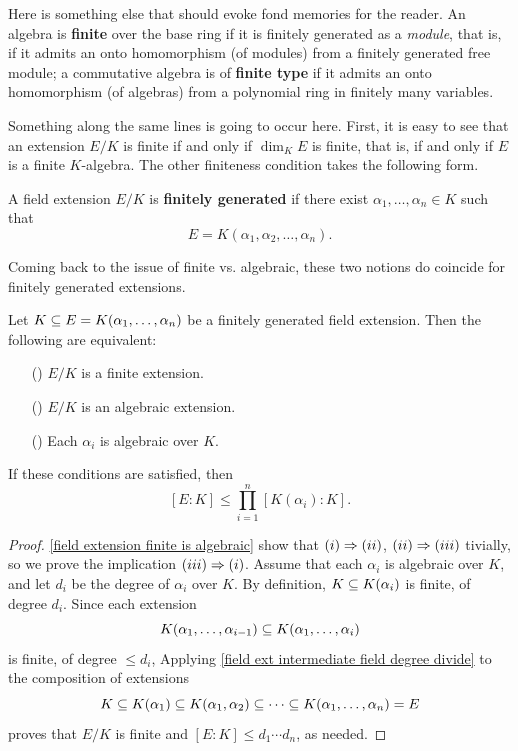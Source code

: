 Here is something else that should evoke fond memories for the reader. An algebra is \textbf{finite} over the base ring if it is finitely generated as a \textit{module}, that is, if it admits an onto homomorphism (of modules) from a finitely generated free module; a commutative algebra is of \textbf{finite type} if it admits an onto homomorphism (of algebras) from a polynomial ring in finitely many variables.\par
Something along the same lines is going to occur here. First, it is easy to see that an extension $E/K$ is finite if and only if $\dim_KE$ is finite, that is, if and only if $E$ is a finite $K$-algebra. The other finiteness condition takes the following form.
\begin{definition}
A field extension $E/K$ is \textbf{finitely generated} if there exist $\alpha_1,\dots,\alpha_n\in K$ such that
\[E=K(\alpha_1,\alpha_2,\dots,\alpha_n).\]
\end{definition}
Coming back to the issue of finite vs. algebraic, these two notions do coincide for finitely generated extensions.
\begin{proposition}\label{field ext finitely generated finite iff}
Let $K\subseteq E=K(\alpha_1,\dots,\alpha_n)$ be a finitely generated field extension. Then the following are equivalent:
\begin{itemize}
\item[(\rmnum{1})] $E/K$ is a finite extension.
\item[(\rmnum{2})] $E/K$ is an algebraic extension.
\item[(\rmnum{3})] Each $\alpha_i$ is algebraic over $K$.
\end{itemize}
If these conditions are satisfied, then 
\[[E:K]\leq\prod_{i=1}^{n}[K(\alpha_i):K].\]
\end{proposition}
\begin{proof}
\cref{field extension finite is algebraic} show that $(\rmnum{1})\Rightarrow(\rmnum{2})$, $(\rmnum{2})\Rightarrow(\rmnum{3})$ tivially, so we prove the implication $(\rmnum{3})\Rightarrow(\rmnum{1})$. Assume that each $\alpha_i$ is algebraic over $K$, and let $d_i$ be the degree of $\alpha_i$ over $K$. By definition, $K\subseteq K(\alpha_i)$ is finite, of degree $d_i$. Since each extension
\[K(\alpha_1,\dots,\alpha_{i-1})\subseteq K(\alpha_1,\dots,\alpha_i)\]
is finite, of degree $\leq d_i$, Applying \cref{field ext intermediate field degree divide} to the composition of extensions
\[K\subseteq K(\alpha_1)\subseteq K(\alpha_1,\alpha_2)\subseteq\cdots\subseteq K(\alpha_1,\dots,\alpha_n)=E\]
proves that $E/K$ is finite and $[E:K]\leq d_1\cdots d_n$, as needed.
\end{proof}
